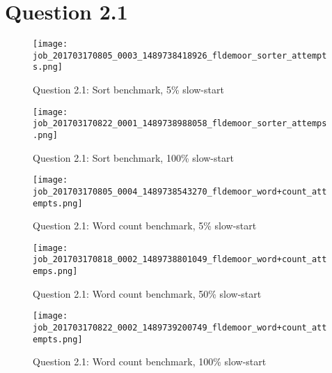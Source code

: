 \section{Question 2.1}

\begin{figure}[!ht]
    \centering
    \texttt{[image: job\_201703170805\_0003\_1489738418926\_fldemoor\_sorter\_attempts.png]}
    \caption{Question 2.1: Sort benchmark, 5\% slow-start}
    \label{2.1.sort.5}
\end{figure}
\newpage

\begin{figure}[!ht]
    \centering
    \texttt{[image: job\_201703170822\_0001\_1489738988058\_fldemoor\_sorter\_attemps.png]}
    \caption{Question 2.1: Sort benchmark, 100\% slow-start}
    \label{2.1.sort.100}
\end{figure}
\newpage

\begin{figure}[!ht]
    \centering
    \texttt{[image: job\_201703170805\_0004\_1489738543270\_fldemoor\_word+count\_attempts.png]}
    \caption{Question 2.1: Word count benchmark, 5\% slow-start}
    \label{2.1.wc.5}
\end{figure}
\newpage

\begin{figure}[!ht]
    \centering
    \texttt{[image: job\_201703170818\_0002\_1489738801049\_fldemoor\_word+count\_attemps.png]}
    \caption{Question 2.1: Word count benchmark, 50\% slow-start}
    \label{2.1.wc.50}
\end{figure}
\newpage

\begin{figure}[!ht]
    \centering
    \texttt{[image: job\_201703170822\_0002\_1489739200749\_fldemoor\_word+count\_attempts.png]}
    \caption{Question 2.1: Word count benchmark, 100\% slow-start}
    \label{2.1.wc.100}
\end{figure}
\newpage
